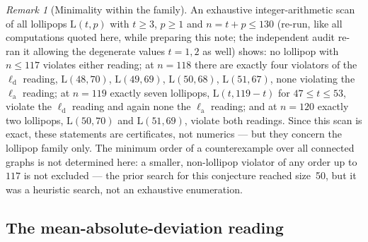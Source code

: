 \documentclass[11pt]{article}
\theoremstyle{remark}
\newtheorem{remark}[theorem]{Remark}
\newcommand{\la}{\ell_{\mathrm{a}}}
\newcommand{\ld}{\ell_{\mathrm{d}}}
\newcommand{\Lol}{\mathrm{L}}
\begin{document}
\begin{remark}[Minimality within the family]\label{rem:154min}
An exhaustive integer-arithmetic scan of all lollipops $\Lol(t,p)$ with
$t \ge 3$, $p \ge 1$ and $n = t + p \le 130$ (re-run, like all computations
quoted here, while preparing this note; the independent audit re-ran it
allowing the degenerate values $t = 1, 2$ as well) shows: no lollipop with
$n \le 117$ violates either reading; at $n = 118$ there are exactly four
violators of the $\ld$ reading, $\Lol(48,70)$, $\Lol(49,69)$, $\Lol(50,68)$,
$\Lol(51,67)$, none violating the $\la$ reading; at $n = 119$ exactly seven
lollipops, $\Lol(t, 119-t)$ for $47 \le t \le 53$, violate the $\ld$ reading
and again none the $\la$ reading; and at $n = 120$ exactly two
lollipops, $\Lol(50,70)$ and $\Lol(51,69)$, violate both readings. Since
this scan is exact, these statements are certificates, not numerics ---
but they concern the lollipop family only. The minimum order of a
counterexample over all connected graphs is not determined here: a smaller,
non-lollipop violator of any order up to $117$ is not excluded --- the prior
search for this conjecture \cite{RoucairolCazenave2025} reached size~50, but
it was a heuristic search, not an exhaustive enumeration.
\end{remark}

\subsection{The mean-absolute-deviation reading}\label{subsec:mad}
\end{document}
